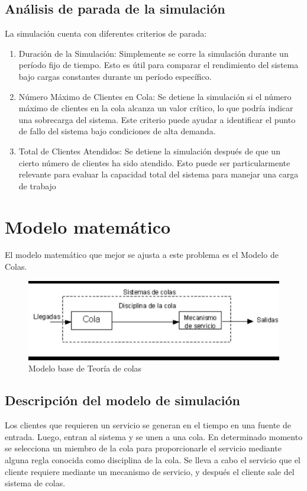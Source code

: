 \documentclass[12pt]{article}
\begin{document}
\subsection{Análisis de parada de la simulación}
La simulación cuenta con diferentes criterios de parada:
\begin{enumerate}
\item Duración de la Simulación: Simplemente se corre la simulación durante un período fijo de tiempo. Esto es útil para comparar el rendimiento del sistema bajo cargas constantes durante un período específico.
\item Número Máximo de Clientes en Cola: Se detiene la simulación si el número máximo de clientes en la cola alcanza un valor crítico, lo que podría indicar una sobrecarga del sistema. Este criterio puede ayudar a identificar el punto de fallo del sistema bajo condiciones de alta demanda.
\item Total de Clientes Atendidos: Se detiene la simulación después de que un cierto número de clientes ha sido atendido. Esto puede ser particularmente relevante para evaluar la capacidad total del sistema para manejar una carga de trabajo
\end{enumerate}


\section{Modelo matemático}

El modelo matemático que mejor se ajusta a este problema es el Modelo de Colas. 
\begin{figure}[H]
\centering
\includegraphics[width=1.2\textwidth]{modelo.jpg}
\caption{Modelo base de Teoría de colas}
\end{figure}

\subsection{Descripción del modelo de simulación}

Los clientes que requieren un servicio se generan en el tiempo en una fuente de entrada.
Luego, entran al sistema y se unen a una cola. En determinado momento se selecciona
un miembro de la cola para proporcionarle el servicio mediante alguna regla conocida como
disciplina de la cola. Se lleva a cabo el servicio que el cliente requiere mediante un mecanismo
de servicio, y después el cliente sale del sistema de colas.
\end{document}
